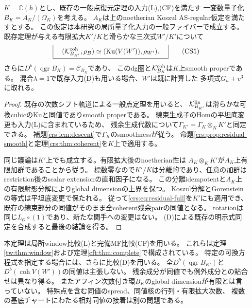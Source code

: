 \begin{theorem}[全coherent残余pairの幾何学的一般点復元]
\label{crs:thm:generic}
$K=\mathbb C(h)$とし、既存の一般点復元定理の入力\textup{(L),(CF)}を満たす
一変数量子化$B_K=A_K/(\Omega_K)$を考える。
$A_K$は上のnoetherian Koszul AS-regular仮定を満たすとする。
この仮定は本研究の局所量子化入力の一般ファイバーで成立する。
既存定理が与える有限拡大$K'/K$と滑らかな三次式$W'/K'$について
\[
 \boxed{\quad
 (\mathcal K^{\rm coh}_{B_{K'}},\rho_B)
 \simeq(\operatorname{Ku}(V(W')),\rho_{W'}).
 \quad}\tag{CS5}\label{crs:eq:generic}
\]
さらに$D^b(\operatorname{qgr}B_K)=\mathcal C_{B_K}$であり、
このdg圏と$\mathcal K^{\rm coh}_{B_K}$は$K$上smooth properである。
混合$\lambda=1$で既存入力\textup{(D)}も用いる場合、$W'$は既に計算した
多項式$G_h+v^3$に取れる。
\end{theorem}
\begin{proof}
既存の次数シフト軌道による一般点定理を用いると、
$\mathcal K^{\rm lin}_{B_{K'}}$は滑らかな可換cubicのKuと同値でありsmooth properである。
線束生成子のHomの平坦底変更も入力(L)に含まれているため、
残余生成代数について$\Gamma_{K'}=\Gamma_K\otimes_KK'$と同定できる。
補題\ref{crs:lem:descent}で$\Gamma_K$のsmoothnessが従う。
命題\ref{crs:prop:residual-smooth}と定理\ref{crs:thm:coherent}を$K$上で適用する。

同じ議論は$K'$上でも成立する。有限拡大後のnoetherian性は
$A_K\otimes_KK'$が$A_K$上有限加群であることから従う。
標数零なので$K'/K$は分離的であり、任意の加群は
restriction後のscalar extensionの直和因子になる。
この分離idempotentと$A_K$上の有限射影分解によりglobal dimensionの上界を保つ。
Koszul分解とGorensteinの等式は平坦底変更で保たれる。
従って\eqref{crs:eq:residual-full}を$K'$にも適用でき、
既存の線束部分の同値がそのまま全coherent残余pairの同値となる。
rotationは同じ$L_{\mathcal O}\circ(1)$であり、新たな関手への変更はない。
(D)による既存の明示式同定を合成すると最後の結論を得る。
\end{proof}

\begin{remark}[主張の境界]
本定理は局所window比較(L)と完備MF比較(CF)を用いる。
これらは定理\ref{tw:thm:window}および定理\ref{cft:thm:complete}で構成されている。
特定の可換方程式を指定する場合には、さらに比較(D)を用いる。
全$D^b(\operatorname{qgr}B_{K'})$と$D^b(\operatorname{coh}V(W'))$の同値は主張しない。
残余成分が同値でも例外成分との貼合せは異なり得る。
またアフィン次数付き環$B_K$のglobal dimensionが有限とは言っていない。
特殊点を含む同値のspread、同値核の行列・有限拡大次数、
複数の基底チャートにわたる相対同値の接着は別の問題である。
\end{remark}

